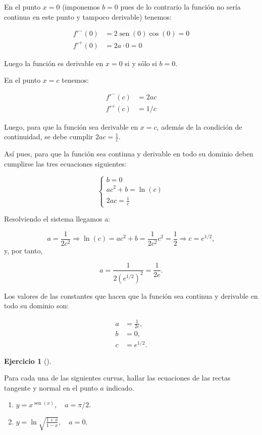 \documentclass[
  spanish,
  a4paper,
]{scrreport}
\providecommand{\tightlist}{%
  \setlength{\itemsep}{0pt}\setlength{\parskip}{0pt}}
\theoremstyle{definition}
\newtheorem{exercise}{Ejercicio}[chapter]
\theoremstyle{remark}
\begin{document}
\begin{tcolorbox}
En el punto \(x=0\) (imponemos \(b=0\) pues de lo contrario la función
no sería continua en este punto y tampoco derivable) tenemos:

\begin{align*}
f'^-(0) &= 2\operatorname{sen}(0)\cos(0) = 0\\
f'^+(0) &= 2a\cdot 0 = 0
\end{align*}

Luego la función es derivable en \(x=0\) si y sólo si \(b=0\).

En el punto \(x=c\) tenemos:

\begin{align*}
f'^-(c) &= 2ac \\
f'^+(c) &= 1/c
\end{align*}

Luego, para que la función sea derivable en \(x=c\), además de la
condición de continuidad, se debe cumplir \(2ac = \frac{1}{c}\).

Así pues, para que la función sea continua y derivable en todo su
dominio deben cumplirse las tres ecuaciones siguientes:

\[
\begin{cases}
b=0 \\
ac^2+b = \ln(c)\\
2ac = \frac 1c
\end{cases}
\]

Resolviendo el sistema llegamos a:

\[
a = \frac{1}{2c^2} \Rightarrow \ln(c) = ac^2+b = \frac{1}{2c^2}c^2 = \frac{1}{2} \Rightarrow c = e^{1/2},
\] y, por tanto,

\[
a = \frac{1}{2(e^{1/2})^2} = \frac{1}{2e}.
\]

Los valores de las constantes que hacen que la función sea continua y
derivable en todo su dominio son:

\begin{align*}
a &= \frac{1}{2e},\\
b &= 0, \\
c &= e^{1/2}.
\end{align*}

\end{tcolorbox}

\begin{exercise}[]\protect\hypertarget{exr-tangente-normal-1}{}\label{exr-tangente-normal-1}

Para cada una de las siguientes curvas, hallar las ecuaciones de las
rectas tangente y normal en el punto \(a\) indicado.

\begin{enumerate}
\def\labelenumi{\alph{enumi}.}
\tightlist
\item
  \(y=x^{\operatorname{sen}(x)},\quad a=\pi/2\).
\item
  \(y=\ln\sqrt{\frac{1+x}{1-x}}, \quad a=0\).
\end{enumerate}

\end{exercise}
\end{document}
